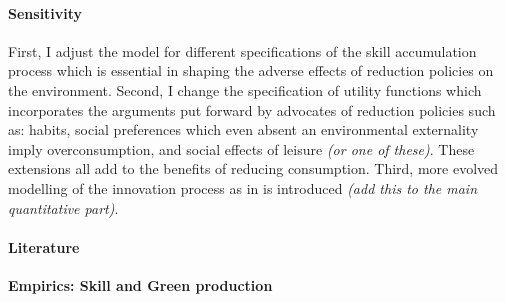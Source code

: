 \paragraph{Sensitivity}
First, I adjust the model for different specifications of the skill accumulation process which is essential in shaping the adverse effects of reduction policies on the environment. Second, I change the specification of utility functions which incorporates the arguments put forward by advocates of reduction policies such as: habits, social preferences which even absent an environmental externality imply overconsumption, and social effects of leisure \textit{(or one of these)}.  These extensions all add to the benefits of reducing consumption. Third, more evolved modelling of the innovation process as in \cite{Fried2018ClimateAnalysis} is introduced \textit{(add this to the main quantitative part)}. 

\paragraph{Literature}
\textbf{Empirics: Skill and Green production}